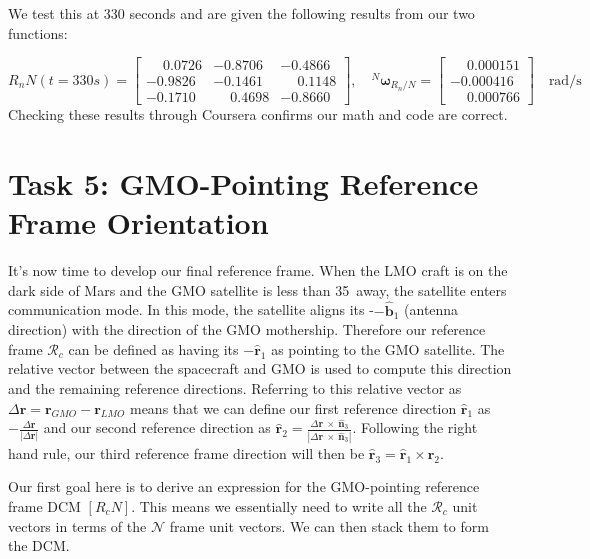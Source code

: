 \documentclass[conf]{new-aiaa}
\begin{document}
We test this at 330 seconds and are given the following results from our two functions: 

\[
R_nN(t = 330s) = 
\begin{bmatrix}
\phantom{-}0.0726 & -0.8706 & -0.4866 \\
-0.9826 & -0.1461 & \phantom{-}0.1148 \\
-0.1710 & \phantom{-}0.4698 & -0.8660
\end{bmatrix}, \quad
{}^N\bm{\omega}_{R_n/N} = 
\begin{bmatrix}
\phantom{-}0.000151 \\ -0.000416 \\ \phantom{-}0.000766
\end{bmatrix} \quad \text{rad/s}
\]
Checking these results through Coursera confirms our math and code are correct.














\section{Task 5: GMO-Pointing Reference Frame Orientation}
It's now time to develop our final reference frame. When the LMO craft is on the dark side of Mars and the GMO satellite is less than 35\textdegree\ away, the satellite enters communication mode. In this mode, the satellite aligns its -$-\hat{\bm{b}}_1$ (antenna direction) with the direction of the GMO mothership. Therefore our reference frame $\mathcal{R}_c$ can be defined as having its $-\hat{\bm{r}}_1$ as pointing to the GMO satellite. The relative vector between the spacecraft and GMO is used to compute this direction and the remaining reference directions. Referring to this relative vector as $\Delta \bm{r} = \bm{r}_{GMO} - \bm{r}_{LMO}$ means that we can define our first reference direction $\hat{\bm{r}}_1$ as $-\frac{\Delta\bm{r}}{|\Delta\bm{r}|}$ and our second reference direction as $\hat{\bm{r}}_2 = \frac{\Delta \bm{r}\ \times\ \hat{\bm{n}}_3}{|\Delta \bm{r}\ \times\ \hat{\bm{n}}_3|}$. Following the right hand rule, our third reference frame direction will then be $\hat{\bm{r}}_3 = \hat{\bm{r}}_1\times\hat{\bm{r}}_2$. 

Our first goal here is to derive an expression for the GMO-pointing reference frame DCM $[R_cN]$. This means we essentially need to write all the $\mathcal{R}_c$ unit vectors in terms of the $\mathcal{N}$ frame unit vectors. We can then stack them to form the DCM.
\end{document}
